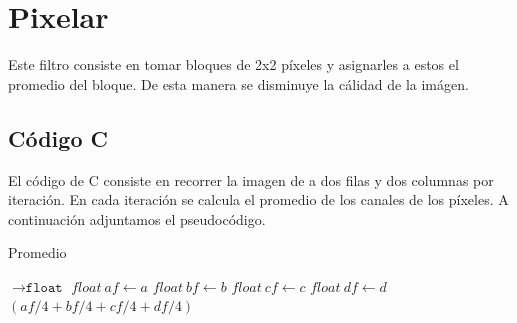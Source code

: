\section{Pixelar}
Este filtro consiste en tomar bloques de 2x2 píxeles y asignarles a estos el promedio del bloque. De esta manera se disminuye la cálidad de la imágen.
\subsection{Código C}
	El código de C consiste en recorrer la imagen de a dos filas y dos columnas por iteración. En cada iteración se calcula el promedio de los canales de los píxeles.
	A continuación adjuntamos el pseudocódigo.

\begin{algorithm}[h!]
\caption{Promedio}
\begin{algorithmic}
    $\to \texttt{float}$
	\State $float~ af \gets a$
	\State $float~ bf \gets b$
	\State $float~ cf \gets c$
	\State $float~ df \gets d$
	\State \Return $(af/4+bf/4+cf/4+df/4)$
	
\EndFunction
\end{algorithmic} 
\end{algorithm}	
	
